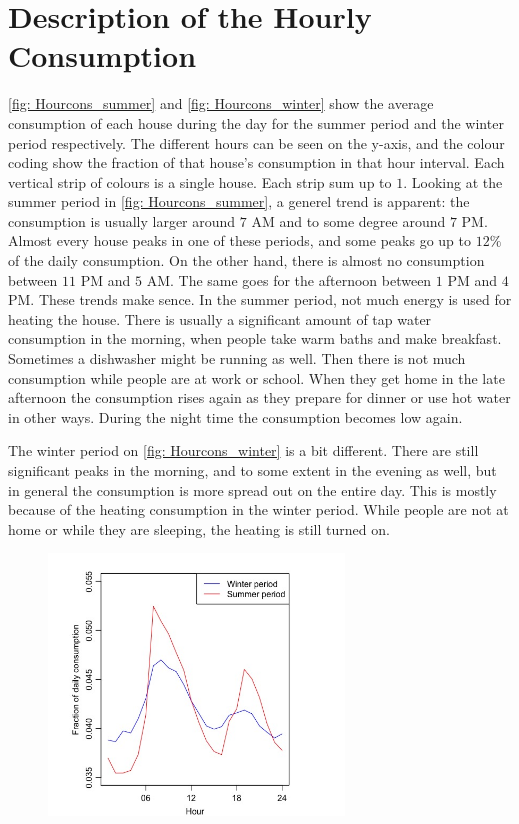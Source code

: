 \section{Description of the Hourly Consumption}
\noindent \cref{fig: Hourcons_summer} and \cref{fig: Hourcons_winter} show the average consumption of each house during the day for the summer period and the winter period respectively. The different hours can be seen on the y-axis, and the colour coding show the fraction of that house's consumption in that hour interval. Each vertical strip of colours is a single house. Each strip sum up to $1$. Looking at the summer period in \cref{fig: Hourcons_summer}, a generel trend is apparent: the consumption is usually larger around $7$ AM and to some degree around $7$ PM. Almost every house peaks in one of these periods, and some peaks go up to $12\%$ of the daily consumption. On the other hand, there is almost no consumption between $11$ PM and $5$ AM. The same goes for the afternoon between $1$ PM and $4$ PM. These trends make sence. In the summer period, not much energy is used for heating the house. There is usually a significant amount of tap water consumption in the morning, when people take warm baths and make breakfast. Sometimes a dishwasher might be running as well. Then there is not much consumption while people are at work or school. When they get home in the late afternoon the consumption rises again as they prepare for dinner or use hot water in other ways. During the night time the consumption becomes low again.

The winter period on \cref{fig: Hourcons_winter} is a bit different. There are still significant peaks in the morning, and to some extent in the evening as well, but in general the consumption is more spread out on the entire day. This is mostly because of the heating consumption in the winter period. While people are not at home or while they are sleeping, the heating is still turned on. 




\begin{figure}
    \centering
    \includegraphics[width=0.7\textwidth]{../../../figures/Season_distribution.jpeg}
    \caption{}
    \label{fig: Season_dist}
\end{figure}




